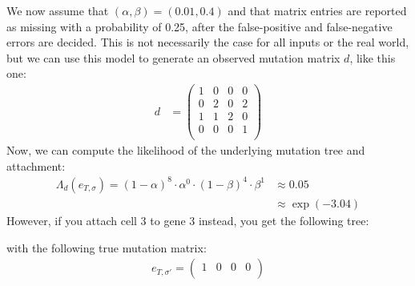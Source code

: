 \begin{example}
    We now assume that $(\alpha, \beta) = (0.01, 0.4)$ and that matrix entries are reported as missing with a probability of 0.25, after the false-positive and false-negative errors are decided. This is not necessarily the case for all inputs or the real world, but we can use this model to generate an observed mutation matrix $d$, like this one:
    \begin{align*}
        d &= \begin{pmatrix}
            1 & 0 & 0 & 0 \\
            0 & 2 & 0 & 2 \\
            1 & 1 & 2 & 0 \\
            0 & 0 & 0 & 1 \\
        \end{pmatrix}
    \end{align*}
    Now, we can compute the likelihood of the underlying mutation tree and attachment:
    \begin{align*}
        \Lambda_d(e_{T, \sigma}) = (1-\alpha)^{8} \cdot \alpha^{0} \cdot (1-\beta)^{4} \cdot \beta^{1} &\approx 0.05 \\
        &\approx \exp(-3.04)
    \end{align*}
    However, if you attach cell 3 to gene 3 instead, you get the following tree:
    \begin{center}
    \end{center}
    with the following true mutation matrix:
    \begin{align*}
        e_{T, \sigma'} = \begin{pmatrix}
            1 & 0 & 0 & 0 \\

\end{pmatrix}
\end{align*}
\end{example}
